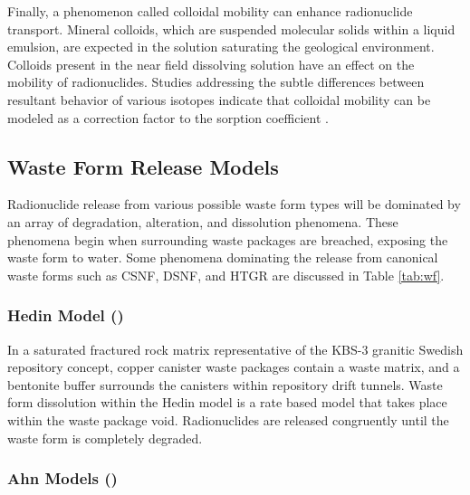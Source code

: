 
Finally, a phenomenon called colloidal mobility can enhance radionuclide 
transport. Mineral colloids, which are suspended molecular solids within a liquid 
emulsion, are expected in the solution saturating the geological environment.
Colloids present in the near field dissolving solution have an effect on the
mobility of radionuclides. Studies addressing the subtle differences between 
resultant behavior of various isotopes indicate that colloidal mobility can be 
modeled as a correction factor to the sorption coefficient 
\cite{bracke_safety_2008}.

\subsection{Waste Form Release Models}

Radionuclide release from various possible waste form types will be dominated by an 
array of degradation, alteration, and dissolution phenomena. These phenomena 
begin when surrounding waste packages are breached, exposing the waste form to 
water. Some phenomena dominating the release from canonical waste forms such as  
\gls{CSNF}, \gls{DSNF}, and \gls{HTGR} are discussed in Table \ref{tab:wf}.








\subsubsection{Hedin Model (\cite{hedin_integrated_2002})}

In a saturated fractured rock matrix representative of the KBS-3 granitic
Swedish repository concept, copper canister waste packages contain a waste
matrix, and a bentonite buffer surrounds the canisters within repository drift
tunnels. Waste form dissolution within the Hedin model is a rate based model
that takes place within the waste package void. Radionuclides are released
congruently until the waste form is completely degraded.
\cite{hedin_integrated_2002} 

\subsubsection{Ahn Models (\cite{ahn_environmental_2004,
ahn_environmental_2007})}

